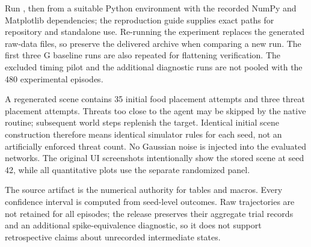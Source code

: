 \documentclass[11pt]{article}
\begin{document}
Run , then  from a suitable Python environment with the recorded NumPy and Matplotlib dependencies; the reproduction guide supplies exact paths for repository and standalone use. Re-running the experiment replaces the generated raw-data files, so preserve the delivered archive when comparing a new run. The first three G baseline runs are also repeated for flattening verification. The excluded timing pilot and the additional diagnostic runs are not pooled with the 480 experimental episodes.

A regenerated scene contains 35 initial food placement attempts and three threat placement attempts. Threats too close to the agent may be skipped by the native routine; subsequent world steps replenish the target. Identical initial scene construction therefore means identical simulator rules for each seed, not an artificially enforced threat count. No Gaussian noise is injected into the evaluated networks. The original UI screenshots intentionally show the stored scene at seed 42, while all quantitative plots use the separate randomized panel.

The source artifact  is the numerical authority for tables and macros. Every confidence interval is computed from seed-level outcomes. Raw trajectories are not retained for all episodes; the release preserves their aggregate trial records and an additional spike-equivalence diagnostic, so it does not support retrospective claims about unrecorded intermediate states.



\end{document}
